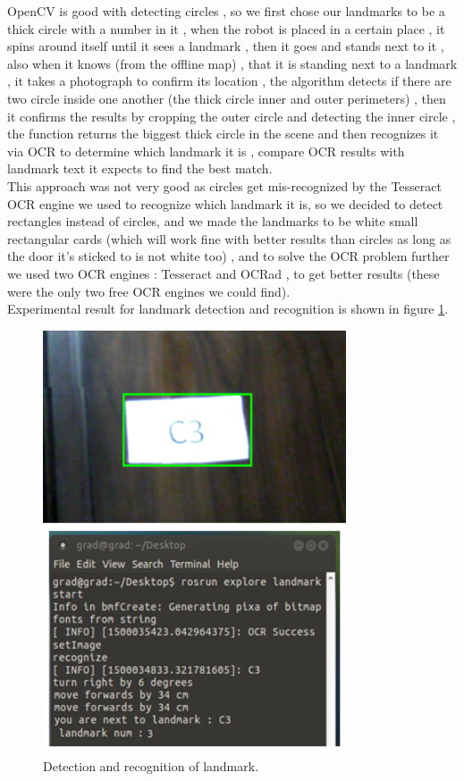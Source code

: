 \documentclass[12pt]{article}
\begin{document}
\noindent OpenCV is good with detecting circles , so we first chose our landmarks to be a thick circle with a number in it , when the robot is placed in a certain place , it spins around itself until it sees a landmark , then it goes and stands next to it , also when it knows (from the offline map) ,  that it is standing next to a landmark ,  it takes a photograph to confirm its location , the algorithm detects if there are two circle inside one another (the thick circle inner and outer perimeters) , then it confirms the results by cropping the outer circle and detecting the inner circle , the function returns the biggest thick circle in the scene and then recognizes it via OCR to determine which landmark it is , compare OCR results with landmark text it expects to find the best match.\\

\noindent This approach was not very good as circles get mis-recognized by the
Tesseract OCR engine we used to recognize which landmark it is, so we decided to detect rectangles instead of circles, and we made the landmarks to be white small rectangular cards (which will work fine with better results than circles as long as the door it’s sticked to is not white too) , and to solve the OCR problem further we used two OCR engines : Tesseract and OCRad , to get better results (these were the only two free OCR engines we could find).\\

\noindent Experimental result for landmark detection and recognition is shown in figure \ref{fig:landmark-result}.

\begin{figure}
	\centering
	\includegraphics[width =0.8\textwidth]{Fig/landmark-result.png}
	\caption{Detection and recognition of landmark.}
	\label{fig:landmark-result}
\end{figure}
\end{document}
